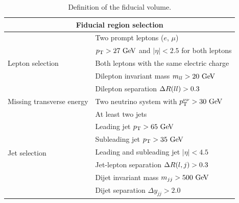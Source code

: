 \begin{table}[htbp]
  \centering
  \begin{tabular}{l | l}
    \multicolumn{2}{c}{Fiducial region selection} \\
    \hline\hline
    \multirow{5}{*}{Lepton selection} & Two prompt leptons ($e$, $\mu$) \\
    & $\pt > 27\gev$ and $|\eta| < 2.5$ for both leptons \\
    & Both leptons with the same electric charge \\
    & Dilepton invariant mass $m_{ll} > 20\gev$\\
    & Dilepton separation $\Delta R (ll) > 0.3$\\
    \hline
    Missing transverse energy & Two neutrino system with $\pt^{\nu\nu} > 30\gev$ \\
    \hline
    \multirow{7}{*}{Jet selection} & At least two jets \\
    & Leading jet $\pt > 65\gev$ \\
    & Subleading jet $\pt > 35\gev$ \\
    & Leading and subleading jet $|\eta| < 4.5$ \\
    & Jet-lepton separation $\Delta R (l,j) > 0.3$ \\
    & Dijet invariant mass $m_{jj} > 500\gev$\\
    & Dijet separation $\Delta y_{jj} > 2.0$ \\
    \hline    
  \end{tabular}
  \caption{Definition of the fiducial volume.}
  \label{tab:ssww13tev_fiducial_vol}
\end{table}

